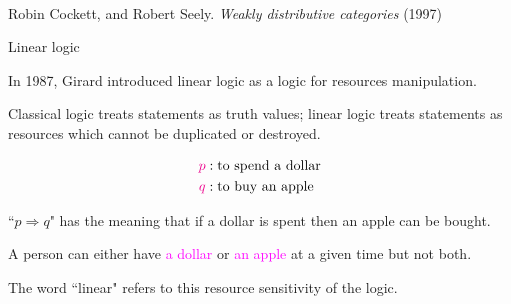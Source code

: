 \documentclass[aspectratio=169]{beamer}
\begin{document}
\begin{frame}

    \begingroup  
        \flushleft
        {\selectfont\hspace{2 cm}\Large\bfseries\color{black}{Linearly distributive categories}}\vspace{1em}\\
        \hspace{2 cm} Robin Cockett, and Robert Seely. {\em Weakly distributive categories} (1997) \\
    \endgroup
\end{frame}

\iffalse

\begin{frame}{Linear logic}

In 1987, Girard introduced linear logic as a logic for resources manipulation.

\vspace{0.5em}

Classical logic treats statements as truth values; linear logic treats statements as resources which cannot be duplicated or destroyed.

\vspace{-1em}

\begin{align*}
    \textcolor{magenta}{p} &:  \text{to spend a dollar} \\
    \textcolor{magenta}{q} &: \text{to buy an apple} 
\end{align*}

``$p \Rightarrow q$" has the meaning that if a dollar is spent then an apple 
can be bought. 

\vspace{0.5em}

A person can either have \textcolor{magenta}{a dollar} or \textcolor{magenta}{an apple} at a given time but not both. 

\vspace{0.5em}
    
    The word ``linear" refers to this resource sensitivity of the 
    logic.
\end{frame}
\end{document}
